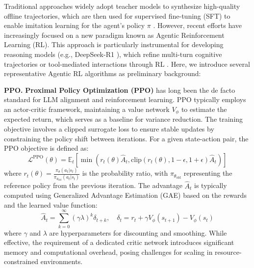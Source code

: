 Traditional approaches widely adopt teacher models to synthesize high-quality offline trajectories, which are then used for supervised fine-tuning (SFT) to enable imitation learning for the agent's policy $\pi$ \cite{ToolBench, Toolformer, Self-Improvement}. However, recent efforts have increasingly focused on a new paradigm known as Agentic Reinforcement Learning (RL).
This approach is particularly instrumental for developing reasoning models (e.g., DeepSeek-R1 \cite{DeepSeek-R1}), which refine multi-turn cognitive trajectories or tool-mediated interactions through RL \cite{GiGPO, ARPO, Search-r1}. Here, we introduce several representative Agentic RL algorithms as preliminary background:

\textbf{PPO.} \textbf{Proximal Policy Optimization (PPO)} \cite{PPO} has long been the de facto standard for LLM alignment and reinforcement learning. PPO typically employs an actor-critic framework, maintaining a value network $V_\phi$ to estimate the expected return, which serves as a baseline for variance reduction. The training objective involves a clipped surrogate loss to ensure stable updates by constraining the policy shift between iterations. For a given state-action pair, the PPO objective is defined as:
\begin{equation}
\mathcal{L}^{\text{PPO}}(\theta) = \mathbb{E}_{t} \left[ \min(r_t(\theta) \hat{A}_t, \text{clip}(r_t(\theta), 1-\epsilon, 1+\epsilon) \hat{A}_t) \right]
\end{equation}
where $r_t(\theta) = \frac{\pi_\theta(a_t|s_t)}{\pi_{\theta_{\text{old}}}(a_t|s_t)}$ is the probability ratio, with $\pi_{\theta_{\text{old}}}$ representing the reference policy from the previous iteration.
The advantage $\hat{A}_t$ is typically computed using Generalized Advantage Estimation (GAE) based on the rewards and the learned value function:
\begin{equation}
\hat{A}_t = \sum_{k=0}^{\infty} (\gamma \lambda)^k \delta_{t+k}, \quad \delta_t = r_t + \gamma V_\phi(s_{t+1}) - V_\phi(s_t)
\end{equation}
where $\gamma$ and $\lambda$ are hyperparameters for discounting and smoothing. While effective, the requirement of a dedicated critic network introduces significant memory and computational overhead, posing challenges for scaling in resource-constrained environments.

